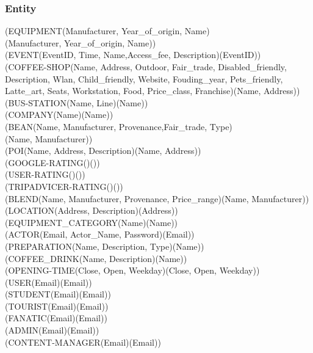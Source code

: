 \subsubsection{Entity}
(EQUIPMENT(Manufacturer, Year\_of\_origin, Name)\\(Manufacturer, Year\_of\_origin, Name))\\
(EVENT(EventID, Time, Name,Access\_fee, Description)(EventID))\\
(COFFEE-SHOP(Name, Address, Outdoor, Fair\_trade, Disabled\_friendly, Description, Wlan, Child\_friendly, Website, Fouding\_year, Pets\_friendly, Latte\_art, Seats, Workstation, Food, Price\_class, Franchise)(Name, Address))\\
(BUS-STATION(Name, Line)(Name))\\
(COMPANY(Name)(Name))\\
(BEAN(Name, Manufacturer, Provenance,Fair\_trade, Type)\\(Name, Manufacturer))\\
(POI(Name, Address, Description)(Name, Address))\\
(GOOGLE-RATING()())\\
(USER-RATING()())\\
(TRIPADVICER-RATING()())\\
(BLEND(Name, Manufacturer, Provenance, Price\_range)(Name, Manufacturer))\\
(LOCATION(Address, Description)(Address))\\
(EQUIPMENT\_CATEGORY(Name)(Name))\\
(ACTOR(Email, Actor\_Name, Password)(Email))\\
(PREPARATION(Name, Description, Type)(Name))\\
(COFFEE\_DRINK(Name, Description)(Name))\\
(OPENING-TIME(Close, Open, Weekday)(Close, Open, Weekday))\\
(USER(Email)(Email))\\
(STUDENT(Email)(Email))\\
(TOURIST(Email)(Email))\\
(FANATIC(Email)(Email))\\
(ADMIN(Email)(Email))\\
(CONTENT-MANAGER(Email)(Email))\\
